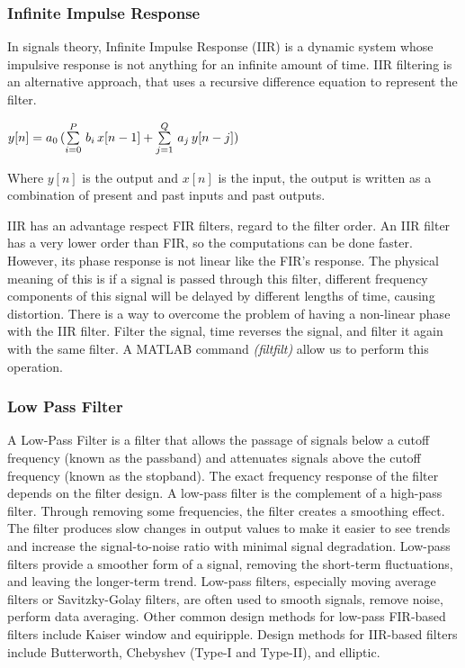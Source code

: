 \documentclass[tesi]{subfiles}
\begin{document}
\subsubsection{Infinite Impulse Response} \label{ssc:Infite Impulse Response}
In signals theory, Infinite Impulse Response (IIR) is a dynamic system whose impulsive response is not anything for an infinite amount of time.
IIR filtering is an alternative approach, that uses a recursive difference equation to represent the filter.
\begin{center}
\begin{large}
$ y[n] = a_{0} \thinspace (\sum\limits_{i=0}^{P}\thinspace  b_{i} \thinspace x[n-1] + \sum\limits_{j=1}^{Q} \thinspace  a_{j} \thinspace  y[n-j])$

\end{large}\end{center}



\noindent Where $y[n]$ is the output and $x[n]$ is the input, the output is written as a combination of present and past inputs and past outputs.

\noindent IIR has an advantage respect FIR filters, regard to the filter order. An IIR filter has a very lower order than FIR, so the computations can be done faster. However, its phase response is not linear like the FIR’s response. The physical meaning of this is if a signal is passed through this filter, different frequency components of this signal will be delayed by different lengths of time, causing distortion.
There is a way to overcome the problem of having a non-linear phase with the IIR filter. 
Filter the signal, time reverses the signal, and filter it again with the same filter. A MATLAB command \textit{(filtfilt) } allow us to perform this operation. 

\subsubsection{Low Pass Filter} \label{ssc:Low Pass Filter}
A Low-Pass Filter is a filter that allows the passage of signals below a cutoff frequency (known as the passband) and attenuates signals above the cutoff frequency (known as the stopband). The exact frequency response of the filter depends on the filter design.
A low-pass filter is the complement of a high-pass filter.
Through removing some frequencies, the filter creates a smoothing effect. The filter produces slow changes in output values to make it easier to see trends and increase the signal-to-noise ratio with minimal signal degradation.
Low-pass filters provide a smoother form of a signal, removing the short-term fluctuations, and leaving the longer-term trend.
Low-pass filters, especially moving average filters or Savitzky-Golay filters, are often used to smooth signals, remove noise, perform data averaging.
Other common design methods for low-pass FIR-based filters include Kaiser window and equiripple.  
Design methods for IIR-based filters include Butterworth, Chebyshev (Type-I and Type-II), and elliptic.
\end{document}
